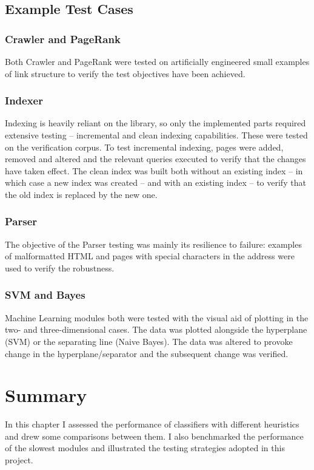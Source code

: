 \documentclass[12pt,notitlepage,twoside]{scrreprt}
\begin{document}
\subsection{Example Test Cases}
\subsubsection{Crawler and PageRank} Both Crawler and PageRank were tested on artificially
engineered small examples of link structure to verify the test objectives have been
achieved.  \subsubsection{Indexer} Indexing is heavily reliant on the library, so only the
implemented parts required extensive testing -- incremental and clean indexing
capabilities. These were tested on the verification corpus.  To test incremental indexing,
pages were added, removed and altered and the relevant queries executed to verify that the
changes have taken effect. The clean index was built both without an existing index -- in
which case a new index was created -- and with an existing index -- to verify that the old
index is replaced by the new one.  \subsubsection{Parser} The objective of the Parser
testing was mainly its resilience to failure: examples of malformatted HTML and pages with
special characters in the address were used to verify the robustness. \subsubsection{SVM
and Bayes} Machine Learning modules both were tested with the visual aid of plotting in
the two- and three-dimensional cases. The data was plotted alongside the hyperplane (SVM)
or the separating line (Naive Bayes). The data was altered to provoke change in the
hyperplane/separator and the subsequent change was verified.
\section{Summary}
In this chapter I assessed the performance of classifiers with different
heuristics and drew some comparisons between them. I also benchmarked the
performance of the slowest modules and illustrated the testing strategies
adopted in this project.

\cleardoublepage
\end{document}
